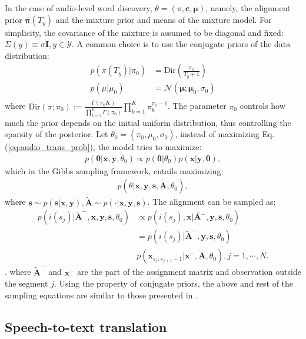 In the case of audio-level word discovery, $\theta = (\pi, \mathbf c, \mathbf \mu)$, namely, the alignment prior $\mathbf \pi(T_y)$ and the mixture prior and means of the mixture model. For simplicity, the covariance of the mixture is assumed to be diagonal and fixed: $\Sigma(y) \equiv \sigma \mathbf I, y \in \mathcal Y$. A common choice is to use the conjugate priors of the data distribution:
\begin{align}\label{eq:parameter_prior}
   p(\pi(T_y)|\pi_0) &= \text{Dir}(\frac{\pi_0}{T_y+1})\\
   p(\mu|\mu_0) &= \mathcal N(\mathbf \mu; \mathbf \mu_0, \sigma_0)\\
\end{align}
where $\text{Dir}(\pi;\pi_0) := \frac{\Gamma(\pi_0 K)}{\prod_{k=1}^K\Gamma(\pi_0)}\prod_{k=1}^K\pi_k^{\pi_0-1}$. The parameter $\pi_0$ controls how much the prior depends on the initial uniform distribution, thus controlling the sparsity of the posterior. Let $\theta_0 = (\pi_0, \mu_0, \sigma_0)$, instead of maximizing Eq. (\ref{eq:audio_trans_prob}), the model tries to maximize:
\begin{align}
    p(\mathbf \theta|\mathbf x, \mathbf y, \theta_0) \propto p(\mathbf \theta|\theta_0) p(\mathbf x|\mathbf y, \mathbf \theta),
\end{align}
which in the Gibbs sampling framework, entails maximizing:
\begin{align}
    p(\theta|\mathbf x, \mathbf y, \mathbf s, \tilde{\mathbf A}, \theta_0),
\end{align}
where $\mathbf s \sim p(\mathbf s|\mathbf x, \mathbf y), \tilde{\mathbf A} \sim p(\cdot|\mathbf x, \mathbf y, \mathbf s)$. The alignment can be sampled as:
\begin{align}\label{eq:sample_alignment}
    p(i(s_j)|\tilde{\mathbf A}^-, \mathbf x, \mathbf y, \mathbf s, \theta_0) &\propto p(i(s_j), \mathbf x|\tilde{\mathbf A^-}, \mathbf y, \mathbf s, \theta_0) \\
    &= p(i(s_j)|\tilde{\mathbf A}^-, \mathbf y, \mathbf s, \theta_0) \\
    &p(\mathbf x_{s_j:s_{j+1}-1}|\mathbf x^-, \tilde{\mathbf A}, \theta_0), j = 1, \cdots, N.
\end{align}.
where $\tilde{\mathbf A}^-$ and $\mathbf x^-$ are the part of the assignment matrix and observation outside the segment $j$. Using the property of conjugate priors, the above and rest of the sampling equations are similar to those presented in \cite{Kamper2016, Kamper2017}.

\subsection{Speech-to-text translation}